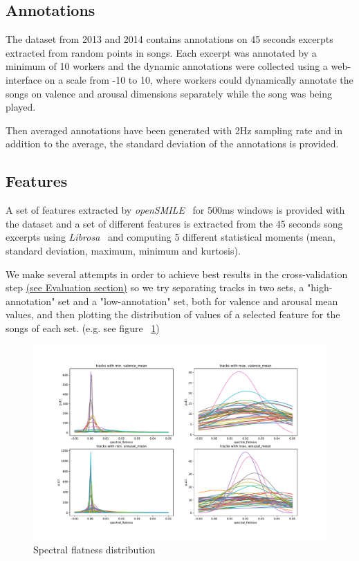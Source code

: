 \subsection{Annotations}

The dataset from 2013 and 2014 contains annotations on 45 seconds excerpts extracted from random points in songs. Each excerpt was annotated by a minimum of 10 workers and the dynamic annotations were collected using a web-interface on a scale from -10 to 10, where workers could dynamically annotate the songs on valence and arousal dimensions separately while the song was being played.~\cite{aljanaki2017developing}

Then averaged annotations have been generated with 2Hz sampling rate and in addition to the average, the standard deviation of the annotations is provided.~\cite{soleymani2016deam}


\subsection{Features}

A set of features extracted by \emph{openSMILE}~\cite{opensmile} for 500ms windows is provided with the dataset and a set of different features is extracted from the 45 seconds song excerpts using \emph{Librosa}~\cite{librosa} and computing 5 different statistical moments (mean, standard deviation, maximum, minimum and kurtosis).

We make several attempts in order to achieve best results in the cross-validation step \hyperref[sec:evaluation]{(see Evaluation section)} so we try separating tracks in two sets, a "high-annotation" set and a "low-annotation" set, both for valence and arousal mean values, and then plotting the distribution of values of a selected feature for the songs of each set. (e.g. see figure ~\ref{fig:va_mean-spectral_flatness-dists})

\begin{figure}[h]
	\centering
	\includegraphics[width=0.9\linewidth]{assets/va_mean-spectral_flatness-dists.pdf}
	\caption{Spectral flatness distribution}
	\label{fig:va_mean-spectral_flatness-dists}
\end{figure}

